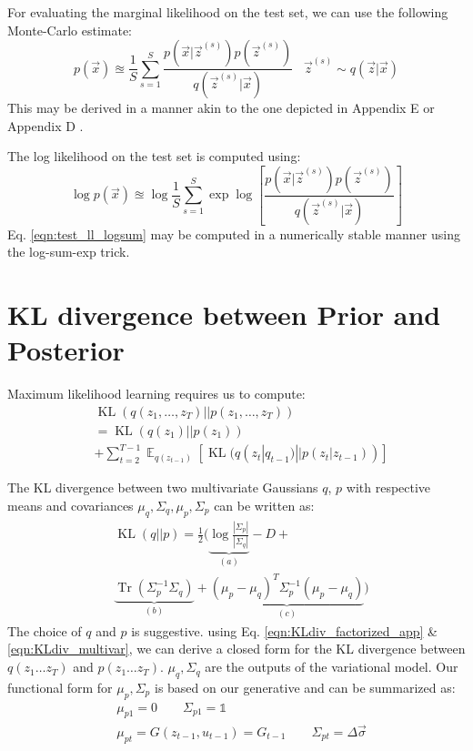 \documentclass[letterpaper]{article}
\newcommand{\Exp}[2]{\mathop{\mathbb{E}}_{#2}\left[#1\right]}
\newcommand{\vsigma}{\vec{\sigma}}
\DeclareMathOperator{\KL}{KL}
\newcommand{\Id}{\mathds{1}}
\newcommand{\dt}{\Delta}
\DeclareMathOperator{\Tr}{Tr}
\newcommand{\Prec}[1]{{\Sigma}_{#1}^{-1}}
\newcommand{\vecx}{\vec{x}}
\newcommand{\vecz}{\vec{z}}
\theoremstyle{plain}
\newcommand{\citep}{\cite}
\begin{document}
{For evaluating the marginal likelihood on the test set, we can use the following Monte-Carlo estimate:
\begin{equation}
	p(\vecx)\approxeq \frac{1}{S} \sum_{s=1}^S \frac{p(\vecx|\vecz^{(s)}) p(\vecz^{(s)}) }{q(\vecz^{(s)}|\vecx)} \;\;\; \vecz^{(s)}\sim q(\vecz|\vecx)
\end{equation}
This may be derived in a manner akin to the one depicted in Appendix E \citep{rezende2014stochastic} or Appendix D \citep{kingma2013auto}.

The log likelihood on the test set is computed using: 
\begin{equation}
	\label{eqn:test_ll_logsum}
	\log p(\vecx)\approxeq \log \frac{1}{S} \sum_{s=1}^S \exp \log\left[\frac{p(\vecx|\vecz^{(s)}) p(\vecz^{(s)}) }{q(\vecz^{(s)}|\vecx)}\right]
\end{equation}
Eq. \ref{eqn:test_ll_logsum} may be computed in a numerically stable manner using the log-sum-exp trick.  
 \section{KL divergence between Prior and Posterior\label{appsec:kldiv}}

Maximum likelihood learning requires us to compute:
\begin{align}
	\label{eqn:KLdiv_factorized_app}
&\KL(q(z_1,\ldots,z_T)||p(z_1,\ldots,z_T))\nonumber\\
&= \KL(q(z_1)||p(z_1)) \nonumber\\
&+ \sum_{t=2}^{T-1} \Exp{\KL(q(z_t|q_{t-1})||p(z_t|z_{t-1}))}{q(z_{t-1})}
\end{align}

The KL divergence between two multivariate Gaussians $q$, $p$ with respective means and covariances $\mu_q, \Sigma_q, \mu_p, \Sigma_p$ can be written as:
\begin{align}
	\label{eqn:KLdiv_multivar}
	&\KL(q||p) = \frac{1}{2}( \underbrace{\log\frac{|\Sigma_p|}{|\Sigma_q|}}_{(a)} -D +\\ 
	&\underbrace{\Tr(\Prec{p}\Sigma_q)}_{(b)} + \underbrace{(\mu_p-\mu_q)^T\Prec{p}(\mu_p-\mu_q)}_{(c)}) \nonumber
\end{align}
The choice of $q$ and $p$ is suggestive. using Eq. \ref{eqn:KLdiv_factorized_app} \& \ref{eqn:KLdiv_multivar}, 
we can derive a closed form for the KL divergence between $q(z_1\ldots z_T)$ and $p(z_1\ldots z_T)$.
$\mu_q,\Sigma_q$ are the outputs of the variational model. Our functional form for $\mu_p,\Sigma_p$ is based on our generative and can
be summarized as: 
\begin{align*}
	&\mu_{p1} = 0\qquad \Sigma_{p1} = \Id\qquad \nonumber\\ 
	&\mu_{pt} = G(z_{t-1},u_{t-1}) = G_{t-1}\qquad \Sigma_{pt} = \dt\vsigma
\end{align*}

}
\end{document}
